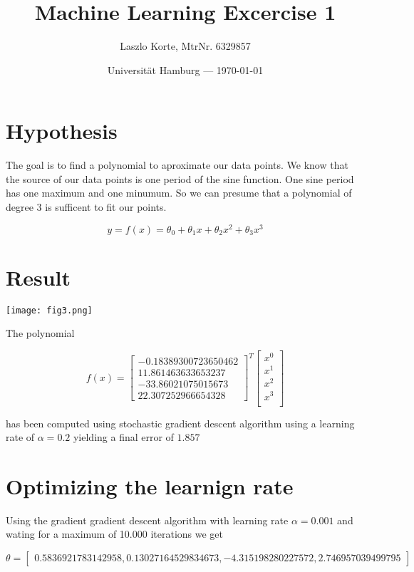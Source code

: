 \documentclass[parskip=half,a4paper]{scrartcl}
\title{Machine Learning Excercise 1}
\author{Laszlo Korte, MtrNr. 6329857}
\date{Universität Hamburg --- \today}
\begin{document}
\maketitle


\section*{Hypothesis}

The goal is to find a polynomial to aproximate our data points. We know that the source of our data points is one period of the sine function. One sine period has one maximum and one minumum. So we can presume that a polynomial of degree 3 is sufficent to fit our points.

$$
y = f(x) =
  \theta_0
+ \theta_1 x
+ \theta_2 x^2
+ \theta_3 x^3
$$


\section*{Result}

\texttt{[image: fig3.png]}

The polynomial

$$
f(x) = \begin{bmatrix}
-0.18389300723650462 \\
11.861463633653237 \\
-33.86021075015673 \\
22.307252966654328
\end{bmatrix}^T
\begin{bmatrix}
x^0 \\
x^1 \\
x^2 \\
x^3 \\
\end{bmatrix}
$$

has been computed using stochastic gradient descent algorithm using a learning rate of $\alpha = 0.2$ yielding a final error of $1.857$


\section*{Optimizing the learnign rate}

Using the gradient gradient descent algorithm with learning rate $\alpha = 0.001$ and wating for a maximum of 10.000 iterations we get

$$
\theta = \begin{bmatrix}
0.5836921783142958,
0.13027164529834673,
-4.315198280227572,
2.746957039499795
\end{bmatrix}
$$
\end{document}
